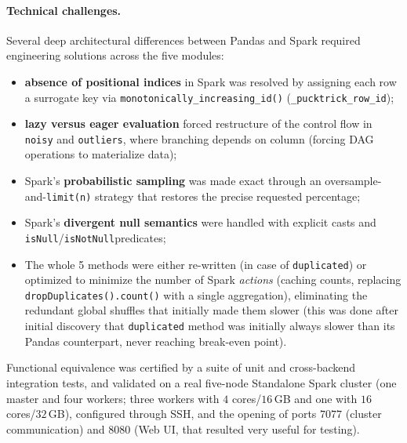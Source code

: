 \documentclass[a4paper, 9pt]{extarticle}
\begin{document}
\paragraph{Technical challenges.}
Several deep architectural differences between Pandas and Spark required engineering solutions across the five modules: 
\begin{itemize}

    \item \textbf{absence of positional indices} in Spark was resolved by assigning each row a surrogate key via \texttt{monotonically\_increasing\_id()} (\texttt{\_pucktrick\_row\_id});
    
    \item \textbf{lazy versus eager evaluation} forced restructure of the control flow in \texttt{noisy} and \texttt{outliers}, where branching depends on column (forcing DAG operations to materialize data);

    \item Spark's \textbf{probabilistic sampling} was made exact through an oversample-and-\texttt{limit(n)} strategy that restores the precise requested percentage;

    \item Spark's \textbf{divergent null semantics} were handled with explicit casts and \texttt{isNull}/\texttt{isNotNull}predicates;

    \item The whole 5 methods were either re-written (in case of \texttt{duplicated}) or optimized to minimize the number of Spark \emph{actions} (caching counts, replacing \texttt{dropDuplicates().count()} with a single aggregation), eliminating the redundant global shuffles that initially made them slower (this was done after initial discovery that \texttt{duplicated} method was initially always slower than its Pandas counterpart, never reaching break-even point).
\end{itemize}

Functional equivalence was certified by a suite of unit and cross-backend integration tests, and validated on a real five-node Standalone Spark cluster (one master and four workers; three workers with $4$ cores/$16$\,GB and one with $16$ cores/$32$\,GB), configured through SSH, and the opening of ports $7077$ (cluster communication) and $8080$ (Web UI, that resulted very useful for testing).
\end{document}
